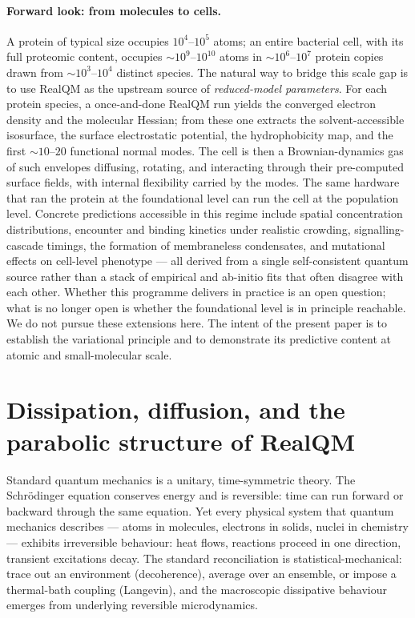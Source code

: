 \documentclass[11pt]{article}
\begin{document}
\paragraph{Forward look: from molecules to cells.}
A protein of typical size occupies $10^4$--$10^5$ atoms; an entire bacterial cell, with its full proteomic content, occupies $\sim 10^9$--$10^{10}$ atoms in $\sim 10^6$--$10^7$ protein copies drawn from $\sim 10^3$--$10^4$ distinct species. The natural way to bridge this scale gap is to use RealQM as the upstream source of \emph{reduced-model parameters}. For each protein species, a once-and-done RealQM run yields the converged electron density and the molecular Hessian; from these one extracts the solvent-accessible isosurface, the surface electrostatic potential, the hydrophobicity map, and the first $\sim 10$--$20$ functional normal modes. The cell is then a Brownian-dynamics gas of such envelopes diffusing, rotating, and interacting through their pre-computed surface fields, with internal flexibility carried by the modes. The same hardware that ran the protein at the foundational level can run the cell at the population level. Concrete predictions accessible in this regime include spatial concentration distributions, encounter and binding kinetics under realistic crowding, signalling-cascade timings, the formation of membraneless condensates, and mutational effects on cell-level phenotype --- all derived from a single self-consistent quantum source rather than a stack of empirical and ab-initio fits that often disagree with each other. Whether this programme delivers in practice is an open question; what is no longer open is whether the foundational level is in principle reachable. We do not pursue these extensions here. The intent of the present paper is to establish the variational principle and to demonstrate its predictive content at atomic and small-molecular scale.

\section{Dissipation, diffusion, and the parabolic structure of RealQM}\label{sec:dissipation}

Standard quantum mechanics is a unitary, time-symmetric theory. The Schr\"odinger equation conserves energy and is reversible: time can run forward or backward through the same equation. Yet every physical system that quantum mechanics describes --- atoms in molecules, electrons in solids, nuclei in chemistry --- exhibits irreversible behaviour: heat flows, reactions proceed in one direction, transient excitations decay. The standard reconciliation is statistical-mechanical: trace out an environment (decoherence), average over an ensemble, or impose a thermal-bath coupling (Langevin), and the macroscopic dissipative behaviour emerges from underlying reversible microdynamics.
\end{document}
